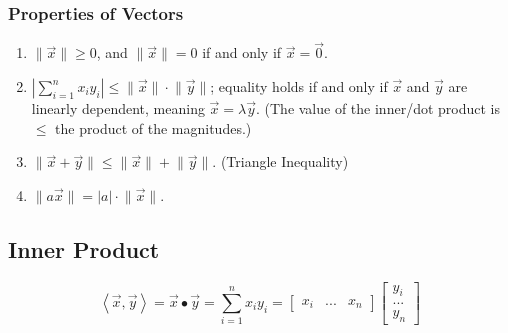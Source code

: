 \documentclass{article}
\begin{document}
	\subsubsection{Properties of Vectors}
	\begin{enumerate}
		\item $\lVert\vec{x}\rVert \geq 0$, and $\lVert\vec{x}\rVert = 0$ if and only if $\vec{x} = \vec{0}$.
		
		\item $\left| \sum_{i=1}^n x_iy_i\right| \leq \lVert\vec{x}\rVert \cdot \lVert\vec{y}\rVert$; equality holds if and only if $\vec{x}$ and $\vec{y}$ are linearly dependent, meaning $\vec{x} = \lambda\vec{y}$. (The value of the inner/dot product is $\leq$ the product of the magnitudes.)
		
		\item $\lVert\vec{x} + \vec{y}\rVert \leq \lVert\vec{x}\rVert + \lVert\vec{y}\rVert$. (Triangle Inequality)
		
		\item $\lVert a\vec{x}\rVert = \left|a\right| \cdot \lVert\vec{x}\rVert$.
	\end{enumerate}
		
	\subsection{Inner Product}
	\begin{equation*}
		\left<\vec{x},\vec{y}\right> = \vec{x}\bullet\vec{y} = \sum_{i=1}^n x_iy_i = 
		\left[\begin{matrix}
			x_i & ... & x_n
		\end{matrix}\right]
		\left[\begin{matrix}
			y_i\\
			...\\
			y_n
		\end{matrix}\right]
	\end{equation*}
	
\end{document}
